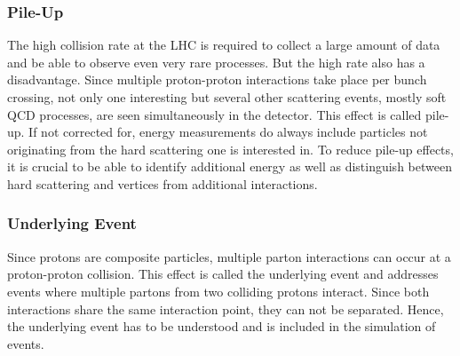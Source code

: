 \subsubsection{Pile-Up}
	The high collision rate at the LHC is required to collect a large amount of data and be able to observe even very rare processes. But the high rate also has a disadvantage. Since multiple proton-proton interactions take place per bunch crossing, not only one interesting but several other scattering events, mostly soft QCD processes, are seen simultaneously in the detector. This effect is called pile-up. If not corrected for, energy measurements do always include particles not originating from the hard scattering one is interested in. To reduce pile-up effects, it is crucial to be able to identify additional energy as well as distinguish between hard scattering and vertices from additional interactions.
	
\subsubsection{Underlying Event}
	Since protons are composite particles, multiple parton interactions can occur at a proton-proton collision. This effect is called the underlying event and addresses events where multiple partons from two colliding protons interact. Since both interactions share the same interaction point, they can not be separated. Hence, the underlying event has to be understood and is included in the simulation of events.
	

